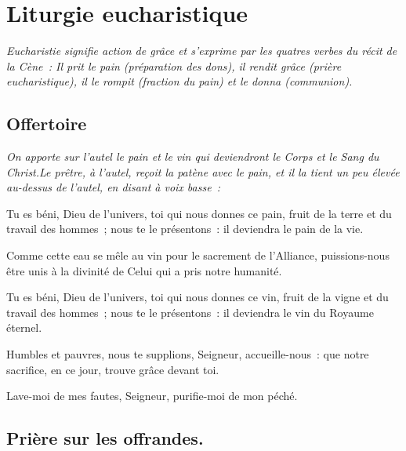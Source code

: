 \section*{Liturgie eucharistique}

\emph{Eucharistie signifie action de grâce et s'exprime par les                 
quatres verbes du récit de la Cène~: Il prit le pain (préparation des           
dons), il rendit grâce (prière eucharistique), il le rompit (fraction           
du pain) et le donna (communion).}

\subsection*{Offertoire}

\emph{On apporte sur l'autel le pain et le vin qui deviendront le               
Corps et le Sang du Christ.Le prêtre, à l'autel, reçoit la patène avec          
le pain, et il la tient un peu élevée au-dessus de l'autel, en disant           
à voix basse~: }

Tu es béni, Dieu de l'univers, toi qui nous donnes ce pain, fruit de
la terre et du travail des hommes~; nous te le présentons~: il
deviendra le pain de la vie.


Comme cette eau se mêle au vin pour le sacrement de l'Alliance,
puissions-nous être unis à la divinité de Celui qui a pris notre
humanité.


Tu es béni, Dieu de l'univers, toi qui nous donnes ce vin, fruit de la
vigne et du travail des hommes~; nous te le présentons~: il deviendra
le vin du Royaume éternel.


Humbles et pauvres, nous te supplions, Seigneur, accueille-nous~: que
notre sacrifice, en ce jour, trouve grâce devant toi.

 Lave-moi de mes fautes, Seigneur, purifie-moi de mon
péché.

\subsection*{Prière sur les offrandes.}

